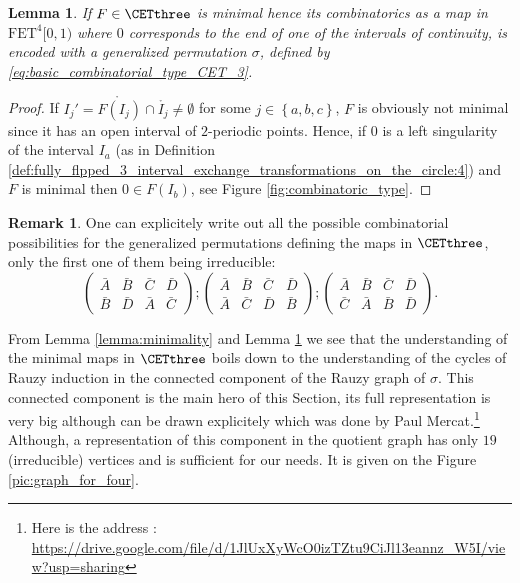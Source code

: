 \documentclass[12pt]{article}
\newtheorem{lemma}{Lemma}
\theoremstyle{definition}
\newtheorem*{remark}{Remark}
\begin{document}
\begin{lemma}\label{lemma:simple_combinatorics_lemma}
If $F \in \CETthree$ is minimal hence its combinatorics as a map in $\mathrm{FET}^{4}[0,1)$ where $0$ corresponds to the end of one of the intervals of continuity, is encoded with a generalized permutation $\sigma$, defined by \eqref{eq:basic_combinatorial_type_CET_3}.
\end{lemma}

\begin{proof}
If $I_j'=\mathring{F(I_j)} \cap \mathring{I_j} \neq \emptyset$ for some $j \in \left\{a,b,c\right\}$, $F$ is obviously not minimal since it has an open interval of $2$-periodic points. Hence, if $0$ is a left singularity of the interval $I_a$ (as in Definition \ref{def:fully_flpped_3_interval_exchange_transformations_on_the_circle:4}) and $F$ is minimal then $0 \in F(I_b)$, see Figure \ref{fig:combinatoric_type}.
\end{proof}

\begin{remark}
One can explicitely write out all the possible combinatorial possibilities for the generalized permutations defining the maps in $\CETthree$, only the first one of them being irreducible:
\begin{equation}\label{eq:choice}
\begin{pmatrix}
\bar{A}&\bar{B}&\bar{C}&\bar{D}\\
\bar{B}&\bar{D}&\bar{A}&\bar{C}
\end{pmatrix};
\begin{pmatrix}
\bar{A}&\bar{B}&\bar{C}&\bar{D}\\
\bar{A}&\bar{C}&\bar{D}&\bar{B}
\end{pmatrix};
\begin{pmatrix}
\bar{A}&\bar{B}&\bar{C}&\bar{D}\\
\bar{C}&\bar{A}&\bar{B}&\bar{D}
\end{pmatrix}.
\end{equation} 
\end{remark}

From Lemma \ref{lemma:minimality} and Lemma \ref{lemma:simple_combinatorics_lemma} we see that the understanding of the minimal maps in $\CETthree$ boils down to the understanding of the cycles of Rauzy induction in the connected component of the Rauzy graph of $\sigma$. This connected component is the main hero of this Section, its full representation is very big although can be drawn explicitely which was done by Paul Mercat.\footnote{Here is the address : \url{https://drive.google.com/file/d/1JlUxXyWcO0izTZtu9CiJl13eannz_W5I/view?usp=sharing}} Although, a representation of this component in the quotient graph has only $19$ (irreducible) vertices and is sufficient for our needs. It is given on the Figure \ref{pic:graph_for_four}.
\end{document}
